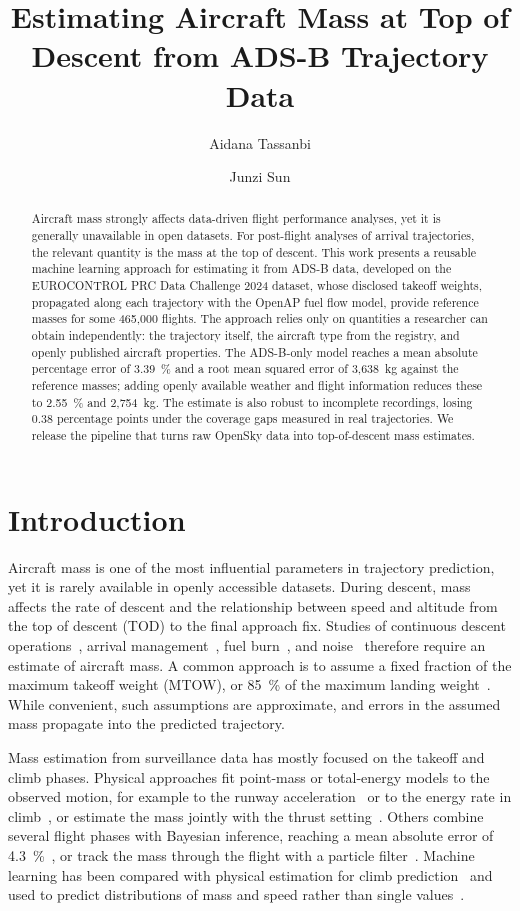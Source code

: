 \documentclass[
  manuscript=proceedings,  %
  layout=preprint,  %
  year=2026,
  volume=x,
]{extra/joas}
\title{Estimating Aircraft Mass at Top of Descent from ADS-B Trajectory Data}
\author{Aidana Tassanbi \orcid{0009-0009-6286-4713}}
\affiliation{Delft University of Technology, Netherlands}
\author{Junzi Sun\orcid{0000-0003-3888-1192}}
\affiliation{Delft University of Technology, Netherlands}
\begin{document}
\begin{abstract}
  Aircraft mass strongly affects data-driven flight performance analyses, yet it is generally unavailable in open datasets. For post-flight analyses of arrival trajectories, the relevant quantity is the mass at the top of descent. This work presents a reusable machine learning approach for estimating it from ADS-B data, developed on the EUROCONTROL PRC Data Challenge 2024 dataset, whose disclosed takeoff weights, propagated along each trajectory with the OpenAP fuel flow model, provide reference masses for some 465{,}000 flights. The approach relies only on quantities a researcher can obtain independently: the trajectory itself, the aircraft type from the registry, and openly published aircraft properties. The ADS-B-only model reaches a mean absolute percentage error of 3.39~\% and a root mean squared error of 3{,}638~kg against the reference masses; adding openly available weather and flight information reduces these to 2.55~\% and 2{,}754~kg. The estimate is also robust to incomplete recordings, losing 0.38 percentage points under the coverage gaps measured in real trajectories. We release the pipeline that turns raw OpenSky data into top-of-descent mass estimates.
\end{abstract}

\section{Introduction}

Aircraft mass is one of the most influential parameters in trajectory prediction, yet it is rarely available in openly accessible datasets. During descent, mass affects the rate of descent and the relationship between speed and altitude from the top of descent (TOD) to the final approach fix. Studies of continuous descent operations~\cite{clarke2004cda,fricke2015cdo}, arrival management~\cite{bronsvoort2013impact}, fuel burn~\cite{lemetti2023arrival}, and noise~\cite{zammit2013accuracy} therefore require an estimate of aircraft mass. A common approach is to assume a fixed fraction of the maximum takeoff weight (MTOW), or 85~\% of the maximum landing weight~\cite{holzapfel2023landing}. While convenient, such assumptions are approximate, and errors in the assumed mass propagate into the predicted trajectory.

Mass estimation from surveillance data has mostly focused on the takeoff and climb phases. Physical approaches fit point-mass or total-energy models to the observed motion, for example to the runway acceleration~\cite{sun2016runway} or to the energy rate in climb~\cite{alligier2013learning,schultz2012adaptive}, or estimate the mass jointly with the thrust setting~\cite{matsuda2026climb}. Others combine several flight phases with Bayesian inference, reaching a mean absolute error of 4.3~\%~\cite{sun2018bayesian}, or track the mass through the flight with a particle filter~\cite{sun2019particle}. Machine learning has been compared with physical estimation for climb prediction~\cite{alligier2015machine} and used to predict distributions of mass and speed rather than single values~\cite{alligier2020predictive}.
\end{document}
